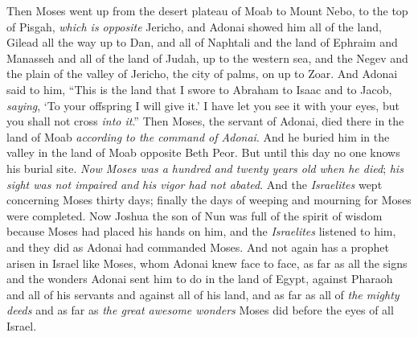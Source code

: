 \begin{biblechapter} %
 Then Moses went up from the desert plateau of Moab to Mount Nebo, to the top of Pisgah, \textit{which is opposite} Jericho, and Adonai showed him all of the land, Gilead all the way up to Dan,
\verse and all of Naphtali and the land of Ephraim and Manasseh and all of the land of Judah, up to the western sea,
\verse and the Negev and the plain of the valley of Jericho, the city of palms, on up to Zoar.
\verse And Adonai said to him, “This is the land that I swore to Abraham to Isaac and to Jacob, \textit{saying}, ‘To your offspring I will give it.’ I have let you see it with your eyes, but you shall not cross \textit{into it}.”
\verse Then Moses, the servant of Adonai, died there in the land of Moab \textit{according to the command of Adonai}.
\verse And he buried him in the valley in the land of Moab opposite Beth Peor. But until this day no one knows his burial site.
\verse \textit{Now Moses was a hundred and twenty years old} \textit{when he died}; \textit{his sight was not impaired and his vigor had not abated}.
\verse And the \textit{Israelites} wept concerning Moses thirty days; finally the days of weeping and mourning for Moses were completed.
\verse Now Joshua the son of Nun was full of the spirit of wisdom because Moses had placed his hands on him, and the \textit{Israelites} listened to him, and they did as Adonai had commanded Moses.
\verse And not again has a prophet arisen in Israel like Moses, whom Adonai knew face to face,
\verse as far as all the signs and the wonders Adonai sent him to do in the land of Egypt, against Pharaoh and all of his servants and against all of his land,
\verse and as far as all of \textit{the mighty deeds} and as far as \textit{the great awesome wonders} Moses did before the eyes of all Israel.
\end{biblechapter}

